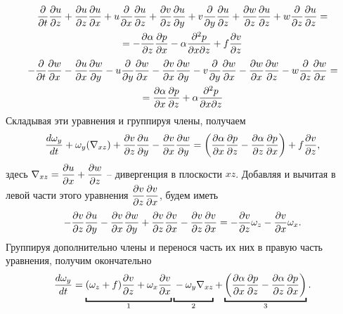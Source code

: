 \begin{multline*}
    \pd{}{t}\pd{u}{z}+
        \pd{u}{z}\pd{u}{x} + u\pd{}{x}\pd{u}{z} +
        \pd{v}{z}\pd{u}{y} + v\pd{}{y}\pd{u}{z} +
        \pd{w}{z}\pd{u}{z} + w\pd{}{z}\pd{u}{z} = \\
    = -\pd{\alpha}{z}\pd{p}{x}-\alpha\frac{\partial^2p}{\partial x \partial z} + 
    f\pd{v}{z} 
\end{multline*}
\begin{multline*}
    -\pd{}{t}\pd{w}{x}-
        \pd{u}{x}\pd{w}{y} - u\pd{}{y}\pd{w}{x} -
        \pd{v}{x}\pd{w}{y} - v\pd{}{y}\pd{w}{x} -
        \pd{w}{x}\pd{w}{z} - w\pd{}{z}\pd{w}{x} = \\
    = \pd{\alpha}{x}\pd{p}{z}+\alpha\frac{\partial^2p}{\partial x \partial z} 
\end{multline*}
Складывая эти уравнения и группируя члены, получаем
\begin{equation*}
    \td{\omega_y}{t}+\omega_y(\nabla_{xz})+\pd{v}{z}\pd{u}{y}-\pd{v}{x}\pd{w}{y} = \left( \pd{\alpha}{x}\pd{p}{z} - \pd{\alpha}{z}\pd{p}{x} \right) + f\pd{v}{z},
\end{equation*}
здесь $\nabla_{xz} = \pd{u}{x} +\pd{w}{z}$ -- дивергенция в плоскости $xz$. 
Добавляя и вычитая в левой части этого уравнения $\pd{v}{z}\pd{v}{x}$, будем иметь
\begin{equation*}
    -\pd{v}{z}\pd{u}{y}-\pd{v}{x}\pd{w}{y}+\pd{v}{z}\pd{v}{x}-\pd{v}{z}\pd{v}{x} = -\pd{v}{z} \omega_z - \pd{v}{x} \omega_x.
\end{equation*}
Группируя дополнительно члены и перенося часть их них в правую часть уравнения, получим окончательно
\begin{equation}
\label{eq:ch10_omegay}
    \td{\omega_y}{t}=
    \ub{\vphantom{\left( \pd{\alpha}{z}\pd{p}{y} \right)}(\omega_z+f)\pd{v}{z} + \omega_x\pd{v}{x}}_{1}
    \ub{\vphantom{\left( \pd{\alpha}{z}\pd{p}{y} \right)}-\omega_y\nabla_{xz}}_{2}+
    \ub{\left( \pd{\alpha}{x}\pd{p}{z} - \pd{\alpha}{z}\pd{p}{x} \right)}_{3}.
\end{equation}

